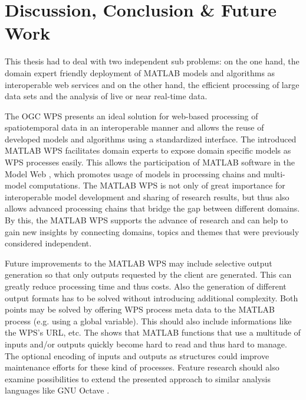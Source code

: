 
\chapter{Discussion, Conclusion \& Future Work}
\label{sec:conclusion}

This thesis had to deal with two independent sub problems: on the one hand, the domain expert friendly deployment of MATLAB models and algorithms as interoperable web services and on the other hand, the efficient processing of large data sets and the analysis of live or near real-time data.

The \ac{OGC} \acl{WPS} presents an ideal solution for web-based processing of spatiotemporal data in an interoperable manner and allows the reuse of developed models and algorithms using a standardized interface. The introduced MATLAB WPS facilitates domain experts to expose domain specific models as WPS processes easily. This allows the participation of MATLAB software in the Model Web \citep{geller2008looking}, which promotes usage of models in processing chains and multi-model computations. The MATLAB WPS is not only of great importance for interoperable model development and sharing of research results, but thus also allows advanced processing chains that bridge the gap between different domains. By this, the MATLAB WPS supports the advance of research and can help to gain new insights by connecting domains, topics and themes that were previously considered independent.

Future improvements to the MATLAB WPS may include selective output generation so that only outputs requested by the client are generated. This can greatly reduce processing time and thus costs. Also the generation of different output formats has to be solved without introducing additional complexity. Both points may be solved by offering WPS process meta data to the MATLAB process (e.g. using a global variable). This should also include informations like the WPS's URL, etc. The \la shows that MATLAB functions that use a multitude of inputs and/or outputs quickly become hard to read and thus hard to manage. The optional encoding of inputs and outputs as structures could improve maintenance efforts for these kind of processes. Feature research should also examine possibilities to extend the presented approach to similar analysis languages like GNU Octave \citep{octave}.

